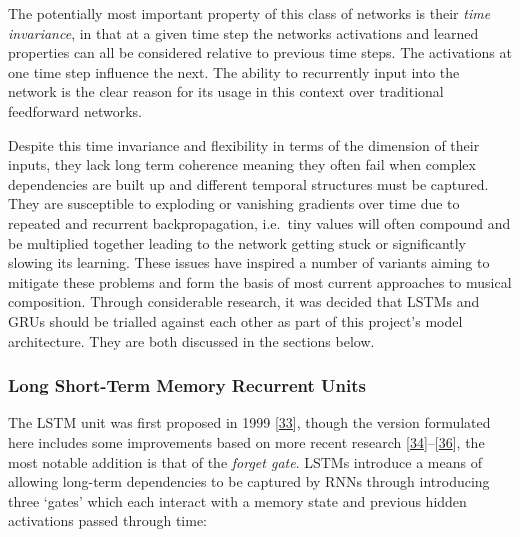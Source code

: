 \documentclass[12pt,]{article}
\begin{document}
The potentially most important property of this class of networks is
their \emph{time invariance}, in that at a given time step the networks
activations and learned properties can all be considered relative to
previous time steps. The activations at one time step influence the
next. The ability to recurrently input into the network is the clear
reason for its usage in this context over traditional feedforward
networks.

Despite this time invariance and flexibility in terms of the dimension
of their inputs, they lack long term coherence meaning they often fail
when complex dependencies are built up and different temporal structures
must be captured. They are susceptible to exploding or vanishing
gradients over time due to repeated and recurrent backpropagation,
i.e.~tiny values will often compound and be multiplied together leading
to the network getting stuck or significantly slowing its learning.
These issues have inspired a number of variants aiming to mitigate these
problems and form the basis of most current approaches to musical
composition. Through considerable research, it was decided that LSTMs
and GRUs should be trialled against each other as part of this project's
model architecture. They are both discussed in the sections below.

\hypertarget{long-short-term-memory-recurrent-units}{%
\subsubsection{Long Short-Term Memory Recurrent
Units}\label{long-short-term-memory-recurrent-units}}

The LSTM unit was first proposed in 1999
{[}\protect\hyperlink{ref-gers1999learning}{33}{]}, though the version
formulated here includes some improvements based on more recent research
{[}\protect\hyperlink{ref-sak2014long}{34}{]}--{[}\protect\hyperlink{ref-zebin2018human}{36}{]},
the most notable addition is that of the \emph{forget gate}. LSTMs
introduce a means of allowing long-term dependencies to be captured by
RNNs through introducing three `gates' which each interact with a memory
state and previous hidden activations passed through time:
\end{document}
